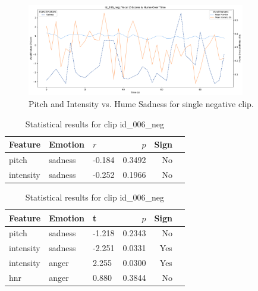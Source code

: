 \begin{figure}[H]
    \centering
    \includegraphics[width=0.85\textwidth]{png/results/rq1_nr3/combined_zscore_hume_id_006_neg_6.pdf}
    \caption{Pitch and Intensity vs. Hume Sadness for single negative clip.}
    \label{fig:006_neg-sadness}
\end{figure}
\begin{table}[H]
    \centering
    \begin{subtable}[t]{0.48\textwidth}
      \centering
      \caption{Clip id\_006\_neg – Pearson Correlation}
      \label{tab:clip006_neg_pearson}
      \begin{tabular}{lllrrl}
        \toprule
        Feature               & Emotion & $r$ & $p$ & Sign \\
        \midrule
        pitch       & sadness    &  -0.184 & 0.3492 & No  \\
        intensity    & sadness    & -0.252 & 0.1966 & No  \\
        \bottomrule
      \end{tabular}
    \end{subtable}
    \hfill
    \begin{subtable}[t]{0.48\textwidth}
      \centering
      \caption{Clip id\_006\_neg – t-test}
      \label{tab:clip006_neg_ttest}
      \begin{tabular}{lllrrl}
        \toprule
        Feature               & Emotion & t & $p$& Sign \\
        \midrule

        pitch       & sadness    &  -1.218 & 0.2343 & No  \\
        intensity    & sadness    & -2.251 & 0.0331 & Yes  \\

        intensity    & anger   &  2.255 & 0.0300 & Yes  \\
        hnr          & anger   &  0.880 & 0.3844 & No \\
        \bottomrule
      \end{tabular}
    \end{subtable}
    \caption{Statistical results for clip id\_006\_neg}
    \label{tab:clip006_neg_stats}
  \end{table}

